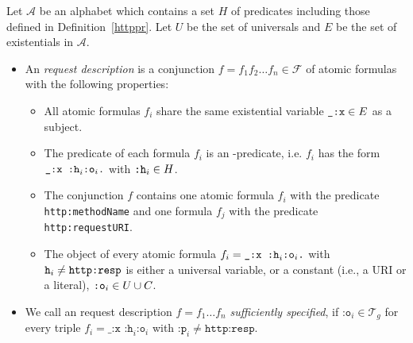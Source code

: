 \begin{definition}
  \label{def:HttpRequestDescription}
 Let $\mathcal{A}$ be an \nthree alphabet which contains a set $H$ of \http predicates including those defined in Definition~\ref{httppr}. Let $U$ be the set of universals and $E$ 
 be the set of existentials in $\mathcal{A}$. 
  \begin{itemize}
\item An \emph{\http request description} is a conjunction $f=f_1 f_2 \ldots f_n\in \mathcal{F}$ of atomic formulas with the following properties:
\begin{itemize}
 \item All atomic formulas $f_i$ share the same existential variable $\verb!_:x!\in E$ as a subject.
 \item The predicate of each formula $f_i$ is an \http-predicate, i.e. $f_i$ has the form $\verb!_:x :h!_i \verb!:o!_i\verb!.!$ with $\verb!:h!_i\in H$.
 \item The conjunction $f$ contains one atomic formula $f_i$ with the predicate\linebreak \verb! http:methodName!
 and one formula $f_j$ with the predicate\linebreak 
 \verb! http:requestURI!.
 \item The object of every atomic formula $f_i=\verb!_:x :h!_i \verb!:o!_i\verb!.!$ with $\verb!h!_i \neq \verb!http:resp!$ is either a universal variable, 
 or a constant  (i.e., a URI or a literal), $\verb!:o!_i\in U\cup C$.
\end{itemize}

%  
\item  We call an \http request description $f=f_1\ldots f_n$ \textit{sufficiently specified},
if  $\texttt{:o}_i\in \mathcal{T}_g$ for every triple $f_i=\texttt{\_:x :h}_i \texttt{:o}_i$ with $\texttt{:p}_i\neq \texttt{http:resp}$. %
\end{itemize}

\end{definition}


